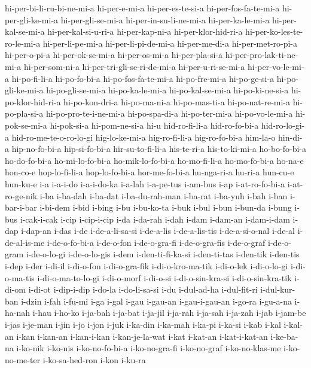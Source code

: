 {hi-per-bi-li-ru-bi-ne-mi-a hi-per-e-mi-a hi-per-es-te-si-a
hi-per-fos-fa-te-mi-a hi-per-gli-ke-mi-a hi-per-gli-se-mi-a
hi-per-in-su-li-ne-mi-a hi-per-ka-le-mi-a hi-per-kal-se-mi-a
hi-per-kal-si-u-ri-a hi-per-kap-ni-a hi-per-klor-hid-ri-a
hi-per-ko-les-te-ro-le-mi-a hi-per-li-pe-mi-a hi-per-li-pi-de-mi-a
hi-per-me-di-a hi-per-met-ro-pi-a hi-per-o-pi-a hi-per-ok-se-mi-a
hi-per-os-mi-a hi-per-pla-si-a hi-per-pro-lak-ti-ne-mi-a hi-per-som-ni-a
hi-per-tri-gli-se-ri-de-mi-a hi-per-u-ri-se-mi-a hi-per-vo-le-mi-a
hi-po-fi-li-a hi-po-fo-bi-a hi-po-fos-fa-te-mi-a hi-po-fre-mi-a
hi-po-ge-si-a hi-po-gli-ke-mi-a hi-po-gli-se-mi-a hi-po-ka-le-mi-a
hi-po-kal-se-mi-a hi-po-ki-ne-si-a hi-po-klor-hid-ri-a hi-po-kon-dri-a
hi-po-ma-ni-a hi-po-mas-ti-a hi-po-nat-re-mi-a hi-po-pla-si-a
hi-po-pro-te-i-ne-mi-a hi-po-spa-di-a hi-po-ter-mi-a hi-po-vo-le-mi-a
hi-pok-se-mi-a hi-pok-si-a hi-pom-ne-si-a hi-u hid-ro-fi-li-a
hid-ro-fo-bi-a hid-ro-lo-gi-a hid-ro-me-te-o-ro-lo-gi hig-lo-ke-mi-a
hig-ro-fi-li-a hig-ro-fo-bi-a him-la-o hin-di-a hip-no-fo-bi-a
hip-si-fo-bi-a hir-su-to-fi-li-a his-te-ri-a his-to-ki-mi-a ho-bo-fo-bi-a
ho-do-fo-bi-a ho-mi-lo-fo-bi-a ho-mik-lo-fo-bi-a ho-mo-fi-li-a
ho-mo-fo-bi-a ho-na-e hon-co-e hop-lo-fi-li-a hop-lo-fo-bi-a
hor-me-fo-bi-a hu-nga-ri-a hu-ri-a hun-cu-e hun-ku-e i-a i-a-i-do
i-a-i-do-ka i-a-lah i-a-pe-tus i-am-bus i-ap i-at-ro-fo-bi-a
i-at-ro-ge-nik i-ba i-ba-dah i-ba-dat i-ba-du-rah-man i-ba-rat i-ba-yuh
i-bah i-ban i-bar-i-bar i-bi-dem i-bid i-bing i-bu i-bu-ko-ta i-buk i-bul
i-bun i-bun-da i-bung i-bus i-cak-i-cak i-cip i-cip-i-cip i-da i-da-rah
i-dah i-dam i-dam-an i-dam-i-dam i-dap i-dap-an i-das i-de i-de-a-li-sa-si
i-de-a-lis i-de-a-lis-tis i-de-a-si-o-nal i-de-al i-de-al-is-me
i-de-o-fo-bi-a i-de-o-fon i-de-o-gra-fi i-de-o-gra-fis i-de-o-graf
i-de-o-gram i-de-o-lo-gi i-de-o-lo-gis i-dem i-den-ti-fi-ka-si
i-den-ti-tas i-den-tik i-den-tis i-dep i-der i-di-il i-di-o-fon
i-di-o-gra-fik i-di-o-kro-ma-tik i-di-o-lek i-di-o-lo-gi i-di-o-ma-tis
i-di-o-ma-to-lo-gi i-di-o-morf i-di-o-si i-di-o-sin-kra-si
i-di-o-sin-kra-tik i-di-om i-di-ot i-dip-i-dip i-do-la i-do-li-sa-si i-du
i-dul-ad-ha i-dul-fit-ri i-dul-kur-ban i-dzin i-fah i-fu-mi i-ga i-gal
i-gau i-gau-an i-gau-i-gau-an i-go-ra i-gu-a-na i-ha-nah i-hau i-ho-ko
i-ja-bah i-ja-bat i-ja-jil i-ja-rah i-ja-sah i-ja-zah i-jab i-jam-be i-jas
i-je-man i-jin i-jo i-jon i-juk i-ka-din i-ka-mah i-ka-pi i-ka-si i-kab
i-kal i-kal-an i-kan i-kan-an i-kan-i-kan i-kan-je-la-wat i-kat i-kat-an
i-kat-i-kat-an i-ke-ba-na i-ko-nik i-ko-nis i-ko-no-fo-bi-a i-ko-no-gra-fi
i-ko-no-graf i-ko-no-klas-me i-ko-no-me-ter i-ko-sa-hed-ron i-kon i-ku-ra
}
